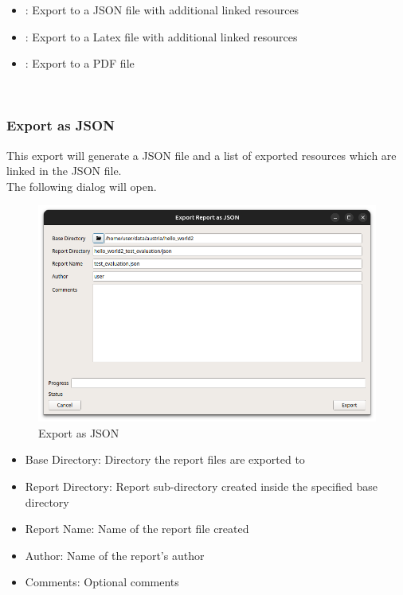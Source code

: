 \begin{itemize}
  \item {}: Export to a JSON file with additional linked resources
  \item {}: Export to a Latex file with additional linked resources
  \item {}: Export to a PDF file
\end{itemize} 
\  \\

\subsubsection{Export as JSON}
\label{sec:report_export_json}

This export will generate a JSON file and a list of exported resources which are linked in the JSON file. \\

The following dialog will open.

\begin{figure}[H]
    \hspace*{-2.5cm}
    \center
    \includegraphics[width=12cm,frame]{figures/export_json.png}
  \caption{Export as JSON}
\end{figure}

\begin{itemize}  
    \item Base Directory: Directory the report files are exported to
    \item Report Directory: Report sub-directory created inside the specified base directory
    \item Report Name: Name of the report file created
    \item Author: Name of the report's author 
    \item Comments: Optional comments
\end{itemize}
\ \\

